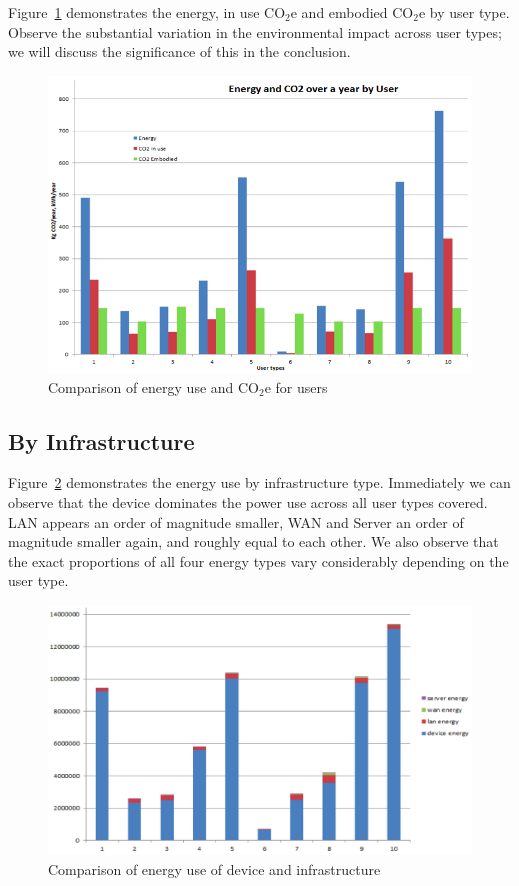 \documentclass[conference]{IEEEtran}
\begin{document}
Figure~\ref{fig:energyuse_co2e_overyearbyuser} demonstrates the
energy, in use CO$_2$e and embodied CO$_2$e by user type.
Observe the substantial variation in the environmental
impact across user types; we will discuss the significance of this
in the conclusion.

\begin{figure}[!htp]
\centering
\includegraphics[width=0.9\columnwidth]{images/energyuse_co2e_overyearbyuser.png}
\caption{Comparison of energy use and CO$_2$e for users}
\label{fig:energyuse_co2e_overyearbyuser} 
\end{figure}

\subsection{By Infrastructure}

Figure~\ref{fig:energyusecomparison} demonstrates the energy use by
infrastructure type. Immediately we can observe that the device
dominates the power use across all user types covered. LAN appears an
order of magnitude smaller, WAN and Server an order of magnitude
smaller again, and roughly equal to each other. We also observe that
the exact proportions of all four energy types vary considerably
depending on the user type.

\begin{figure}[!htp]
\centering
\includegraphics[width=0.9\columnwidth]{images/energyuse_comparison.png}
\caption{Comparison of energy use of device and infrastructure}
\label{fig:energyusecomparison} 
\end{figure}
\end{document}
